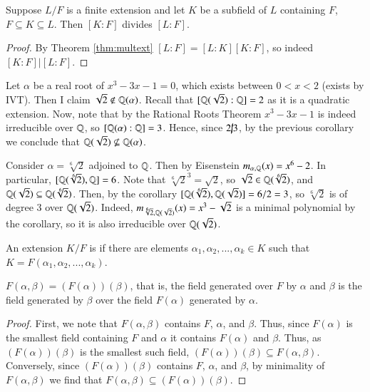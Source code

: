 \begin{corollary}\label{cor:extdiv}
    Suppose $L/F$ is a finite extension and let $K$ be a subfield of $L$ containing $F$, $F \subseteq K \subseteq L$. Then $[K:F]$ divides $[L:F]$.
\end{corollary}
\begin{proof}
    By Theorem \ref{thm:multext} $[L:F] = [L:K][K:F]$, so indeed $[K:F] \vert [L:F]$.
\end{proof}


\begin{example}
    Let $\alpha$ be a real root of $x^3-3x-1 = 0$, which exists between $0 < x < 2$ (exists by IVT). Then I claim $\sqrt{2} \notin \mathbb Q(\alpha)$. Recall that $[\mathbb Q(\sqrt{2}):\mathbb Q] = 2$ as it is a quadratic extension. Now, note that by the Rational Roots Theorem $x^3-3x-1$ is indeed irreducible over $\mathbb Q$, so $[\mathbb Q(\alpha):\mathbb Q] = 3$. Hence, since $2\cancel{\vert}3$, by the previous corollary we conclude that $\mathbb Q(\sqrt{2})\nsubseteq \mathbb Q(\alpha)$.
\end{example}

\begin{example}
    Consider $\alpha = \sqrt[6]{2}$ adjoined to $\mathbb Q$. Then by Eisenstein $m_{\alpha,\mathbb Q}(x) = x^6 - 2$. In particular, $[\mathbb Q(\sqrt[6]{2}),\mathbb Q] = 6$. Note that $\sqrt[6]{2}^3 = \sqrt{2}$, so $\sqrt{2} \in \mathbb Q(\sqrt[6]{2})$, and $\mathbb Q(\sqrt{2}) \subseteq \mathbb Q(\sqrt[6]{2})$. Then, by the corollary $[\mathbb Q(\sqrt[6]{2}),\mathbb Q(\sqrt{2})] = 6/2 = 3$, so $\sqrt[6]{2}$ is of degree $3$ over $\mathbb Q(\sqrt{2})$. Indeed, $m_{\sqrt[6]{2},\mathbb Q(\sqrt{2})}(x) = x^3 - \sqrt{2}$ is a minimal polynomial by the corollary, so it is also irreducible over $\mathbb Q(\sqrt{2})$.
\end{example}

\begin{definition}
    An extension $K/F$ is  if there are elements $\alpha_1,\alpha_2,...,\alpha_k \in K$ such that $K = F(\alpha_1,\alpha_2,...,\alpha_k)$.
\end{definition}


\begin{lemma}
    $F(\alpha,\beta) = (F(\alpha))(\beta)$, that is, the field generated over $F$ by $\alpha$ and $\beta$ is the field generated by $\beta$ over the field $F(\alpha)$ generated by $\alpha$.
\end{lemma}
\begin{proof}
    First, we note that $F(\alpha,\beta)$ contains $F$, $\alpha$, and $\beta$. Thus, since $F(\alpha)$ is the smallest field containing $F$ and $\alpha$ it contains $F(\alpha)$ and $\beta$. Thus, as $(F(\alpha))(\beta)$ is the smallest such field, $(F(\alpha))(\beta) \subseteq F(\alpha,\beta)$. Conversely, since $(F(\alpha))(\beta)$ contains $F$, $\alpha$, and $\beta$, by minimality of $F(\alpha,\beta)$ we find that $F(\alpha,\beta) \subseteq (F(\alpha))(\beta)$.
\end{proof}

